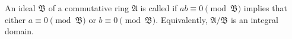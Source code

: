 An ideal $\mathfrak{B}$ of a commutative ring $\mathfrak{A}$ is called  if $ab \equiv 0 \pmod{\mathfrak{B}}$ implies that either $a \equiv 0 \pmod{\mathfrak{B}}$ or $b \equiv 0 \pmod{\mathfrak{B}}$. Equivalently, $\mathfrak{A}/\mathfrak{B}$ is an integral domain.
